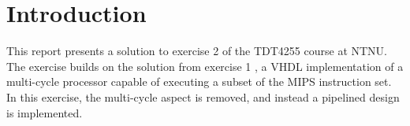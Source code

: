 \chapter{Introduction}
This report presents a solution to exercise 2 of the TDT4255 course at NTNU.
The exercise builds on the solution from exercise 1 \cite{bib:ex1-report},
a VHDL implementation of a multi-cycle processor capable of executing a subset of the MIPS instruction set.
In this exercise, the multi-cycle aspect is removed,
and instead a pipelined design is implemented.





